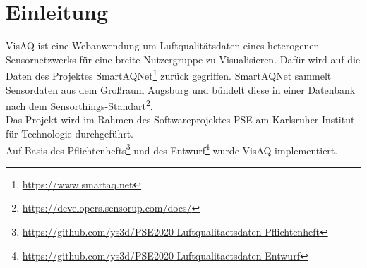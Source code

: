 \section{Einleitung}
VisAQ ist eine Webanwendung um Luftqualitätsdaten eines heterogenen \gls{Sensor}netzwerks für eine breite Nutzergruppe zu Visualisieren.
Dafür wird auf die Daten des Projektes SmartAQNet\footnote{\url{https://www.smartaq.net}} zurück gegriffen.
SmartAQNet sammelt Sensordaten aus dem Großraum Augsburg und bündelt diese in einer Datenbank nach dem Sensorthings-Standart\footnote{\url{https://developers.sensorup.com/docs/}}.
\\
Das Projekt wird im Rahmen des Softwareprojektes PSE am Karlsruher Institut für Technologie durchgeführt.
\\
Auf Basis des Pflichtenhefts\footnote{\url{https://github.com/ys3d/PSE2020-Luftqualitaetsdaten-Pflichtenheft}} und des Entwurf\footnote{\url{https://github.com/ys3d/PSE2020-Luftqualitaetsdaten-Entwurf}} wurde VisAQ implementiert.
\\
